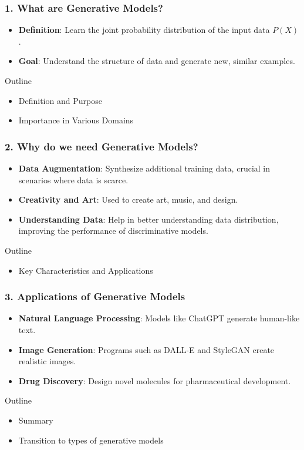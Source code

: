 \documentclass[aspectratio=169]{beamer}
\begin{document}
\begin{frame}[fragile]
    \frametitle{1. What are Generative Models?}
    \begin{itemize}
        \item \textbf{Definition}: Learn the joint probability distribution of the input data \( P(X) \).
        \item \textbf{Goal}: Understand the structure of data and generate new, similar examples.
    \end{itemize}
    \begin{block}{Outline}
        \begin{itemize}
            \item Definition and Purpose
            \item Importance in Various Domains
        \end{itemize}
    \end{block}
\end{frame}

\begin{frame}[fragile]
    \frametitle{2. Why do we need Generative Models?}
    \begin{itemize}
        \item \textbf{Data Augmentation}: Synthesize additional training data, crucial in scenarios where data is scarce.
        \item \textbf{Creativity and Art}: Used to create art, music, and design.
        \item \textbf{Understanding Data}: Help in better understanding data distribution, improving the performance of discriminative models.
    \end{itemize}
    \begin{block}{Outline}
        \begin{itemize}
            \item Key Characteristics and Applications
        \end{itemize}
    \end{block}
\end{frame}

\begin{frame}[fragile]
    \frametitle{3. Applications of Generative Models}
    \begin{itemize}
        \item \textbf{Natural Language Processing}: Models like ChatGPT generate human-like text.
        \item \textbf{Image Generation}: Programs such as DALL-E and StyleGAN create realistic images.
        \item \textbf{Drug Discovery}: Design novel molecules for pharmaceutical development.
    \end{itemize}
    \begin{block}{Outline}
        \begin{itemize}
            \item Summary
            \item Transition to types of generative models
        \end{itemize}
    \end{block}
\end{frame}
\end{document}
